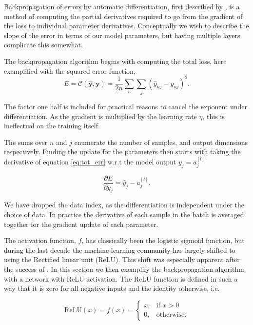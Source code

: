 Backpropagation of errors by automatic differentiation, first described by \citet{Linnainmaa1976}, is a method of computing the partial derivatives required to go from the gradient of the loss to individual parameter derivatives. Conceptually we wish to describe the slope of the error in terms of our model parameters, but having multiple layers complicate this somewhat. 

The backpropagation algorithm begins with computing the total loss, here exemplified with the squared error function,
\begin{equation}\label{eq:tot_err}
	E = \mathcal{C}(\mathbf{\hat{y}}, \mathbf{y}) = \frac{1}{2n}\sum_n \sum_j (\hat{y}_{nj}-y_{nj} )^2.
\end{equation}

\noindent The factor one half is included for practical reasons to cancel the exponent under differentiation. As the gradient is multiplied by the learning rate $\eta$, this is ineffectual on the training itself. 

The sums over $n$ and $j$ enumerate the number of samples, and output dimensions respectively. Finding the update for the parameters then starts with taking the derivative of equation \ref{eq:tot_err} w.r.t the model output $y_j  = a^{[l]}_j$

\begin{equation}\label{eq:err_grad}
	\frac{\partial E}{\partial y_{j}} = \hat{y}_{j} - a^{[l]}_j.
\end{equation}

\noindent We have dropped the data index, as the differentiation is independent under the choice of data. In practice the derivative of each sample in the batch is averaged together for the gradient update of each parameter. 

The activation function, $f$, has classically been the logistic sigmoid function, but during the last decade the machine learning community has largely shifted to using the Rectified linear unit (ReLU). This shift was especially apparent after the success of \citet{Krizhevsky2012}. In this section we then exemplify the backpropagation algorithm with a network with ReLU activation. The ReLU function is defined in such a way that it is zero for all negative inputs and the identity otherwise, i.e. 

\begin{equation}\label{eq:relu}
	\text{ReLU} (x) = f(x) = \begin{cases}
	x, & \text{if } x > 0 \\
	0,  & \text{otherwise} .
	\end{cases}
\end{equation}

